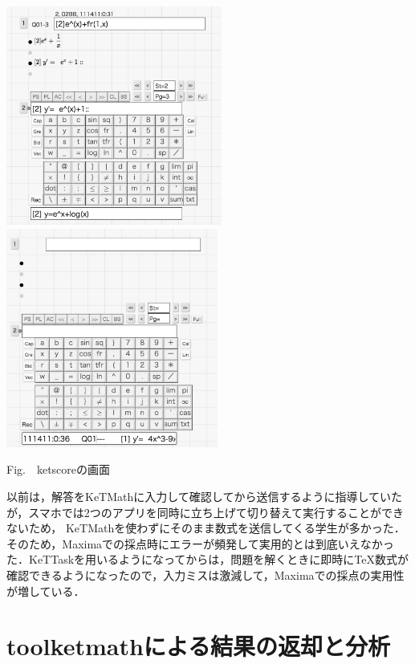 \documentclass[a4j,12pt]{ujarticle}
\begin{document}
\begin{center}
\includegraphics[bb=0.00 0.00 720.00 730.00,height=72mm]{fig/ketscore1bw.pdf}
\hspace{5mm}%
\includegraphics[bb=0.00 0.00 691.00 715.00,height=72mm]{fig/ketscore3bw.pdf}

\addtocounter{figure}{1}Fig.\thefigure\ \ ketscoreの画面\vspace{-1mm}
\end{center}

以前は，解答をKeTMathに入力して確認してから送信するように指導していたが，スマホでは2つのアプリを同時に立ち上げて切り替えて実行することができないため，
KeTMathを使わずにそのまま数式を送信してくる学生が多かった．そのため，Maximaでの採点時にエラーが頻発して実用的とは到底いえなかった．KeTTaskを用いるようになってからは，問題を解くときに即時に\TeX 数式が確認できるようになったので，入力ミスは激減して，Maximaでの採点の実用性が増している．

\section{toolketmathによる結果の返却と分析}
\end{document}
